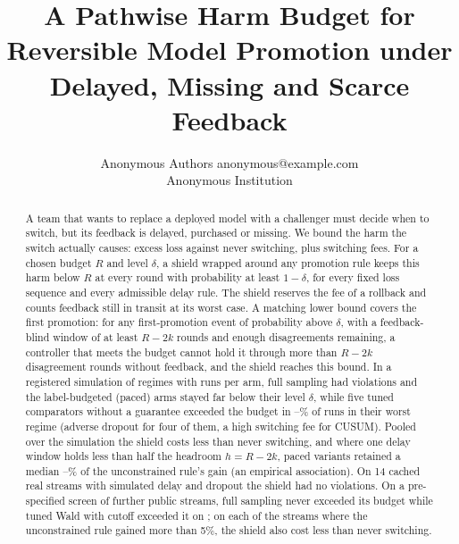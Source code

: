 \documentclass[10pt]{article}
\title{A Pathwise Harm Budget for Reversible Model Promotion under Delayed, Missing and Scarce Feedback}
\author{\name Anonymous Authors \email anonymous@example.com \\
      \addr Anonymous Institution}
\theoremstyle{plain}
\theoremstyle{definition}
\begin{document}
\maketitle

\begin{abstract}
A team that wants to replace a deployed model with a challenger must decide when to switch, but its feedback is delayed, purchased or missing. We bound the harm the switch actually causes: excess loss against never switching, plus switching fees. For a chosen budget $R$ and level $\delta$, a shield wrapped around any promotion rule keeps this harm below $R$ at every round with probability at least $1-\delta$, for every fixed loss sequence and every admissible delay rule. The shield reserves the fee of a rollback and counts feedback still in transit at its worst case. A matching lower bound covers the first promotion: for any first-promotion event of probability above $\delta$, with a feedback-blind window of at least $R-2k$ rounds and enough disagreements remaining, a controller that meets the budget cannot hold it through more than $R-2k$ disagreement rounds without feedback, and the shield reaches this bound. In a registered simulation of \NRegimes{} regimes with \NRunsPerArm{} runs per arm, full sampling had \COneTotal{} violations and the label-budgeted (paced) arms stayed far below their level $\delta$, while five tuned comparators without a guarantee exceeded the budget in \CThreeMinWorst--\CThreeMaxWorst\% of runs in their worst regime (adverse dropout for four of them, a high switching fee for CUSUM). Pooled over the simulation the shield costs less than never switching, and where one delay window holds less than half the headroom $h=R-2k$, paced variants retained a median \KeepLo--\KeepHi\% of the unconstrained rule's gain (an empirical association). On 14 cached real streams with simulated delay and dropout the shield had no violations. On a pre-specified screen of \ScreenPool{} further public streams, full sampling never exceeded its budget while tuned Wald with cutoff exceeded it on \ScreenWaldExceedStreams{}; on each of the \ScreenGainful{} streams where the unconstrained rule gained more than 5\%, the shield also cost less than never switching.
\end{abstract}
\end{document}
